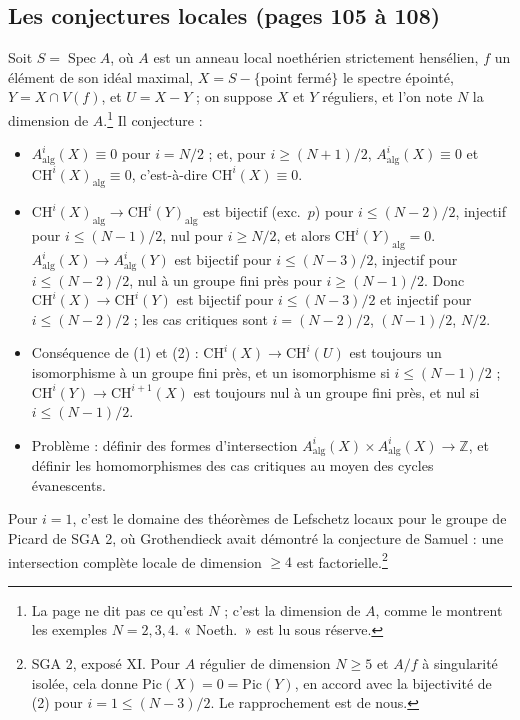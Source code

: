 \documentclass[11pt,a4paper]{article}
\begin{document}
\subsection*{Les conjectures locales (pages 105 à 108)}

Soit $S = \operatorname{Spec} A$, où $A$ est un anneau local noethérien
strictement hensélien, $f$ un élément de son idéal maximal, $X = S -
\{\text{point fermé}\}$ le spectre épointé, $Y = X \cap V(f)$, et $U = X - Y$ ;
on suppose $X$ et $Y$ réguliers, et l'on note $N$ la dimension de
$A$.\footnote{La page ne dit pas ce qu'est $N$ ; c'est la dimension de $A$,
comme le montrent les exemples $N = 2, 3, 4$. « Noeth.\ » est lu sous
réserve.} Il conjecture :

\begin{itemize}
  \item[(1)] $A^{i}_{\mathrm{alg}}(X) \equiv 0$ pour $i = N/2$ ; et, pour $i
  \geqslant (N+1)/2$, $A^{i}_{\mathrm{alg}}(X) \equiv 0$ et
  $\mathrm{CH}^{i}(X)_{\mathrm{alg}} \equiv 0$, c'est-à-dire $\mathrm{CH}^{i}(X)
  \equiv 0$.
  \item[(2)] $\mathrm{CH}^{i}(X)_{\mathrm{alg}} \to \mathrm{CH}^{i}(Y)_{\mathrm{alg}}$
  est bijectif (exc.\ $p$) pour $i \leqslant (N-2)/2$, injectif pour $i \leqslant
  (N-1)/2$, nul pour $i \geqslant N/2$, et alors
  $\mathrm{CH}^{i}(Y)_{\mathrm{alg}} = 0$. $A^{i}_{\mathrm{alg}}(X) \to
  A^{i}_{\mathrm{alg}}(Y)$ est bijectif pour $i \leqslant (N-3)/2$, injectif pour $i
  \leqslant (N-2)/2$, nul à un groupe fini près pour $i \geqslant (N-1)/2$. Donc
  $\mathrm{CH}^{i}(X) \to \mathrm{CH}^{i}(Y)$ est bijectif pour $i \leqslant
  (N-3)/2$ et injectif pour $i \leqslant (N-2)/2$ ; les cas critiques sont $i =
  (N-2)/2$, $(N-1)/2$, $N/2$.
  \item[(3)] Conséquence de (1) et (2) : $\mathrm{CH}^{i}(X) \to
  \mathrm{CH}^{i}(U)$ est toujours un isomorphisme à un groupe fini près, et un
  isomorphisme si $i \leqslant (N-1)/2$ ; $\mathrm{CH}^{i}(Y) \to
  \mathrm{CH}^{i+1}(X)$ est toujours nul à un groupe fini près, et nul si $i
  \leqslant (N-1)/2$.
  \item[(4)] Problème : définir des formes d'intersection $A^{i}_{\mathrm{alg}}(X)
  \times A^{i}_{\mathrm{alg}}(X) \to \mathbb{Z}$, et définir les homomorphismes
  des cas critiques au moyen des cycles évanescents.
\end{itemize}

Pour $i = 1$, c'est le domaine des théorèmes de Lefschetz locaux pour le groupe
de Picard de SGA 2, où Grothendieck avait démontré la conjecture de Samuel : une
intersection complète locale de dimension $\geqslant 4$ est
factorielle.\footnote{SGA 2, exposé XI. Pour $A$ régulier de dimension $N
\geqslant 5$ et $A/f$ à singularité isolée, cela donne $\mathrm{Pic}(X) = 0 =
\mathrm{Pic}(Y)$, en accord avec la bijectivité de (2) pour $i = 1 \leqslant
(N-3)/2$. Le rapprochement est de nous.}
\end{document}
